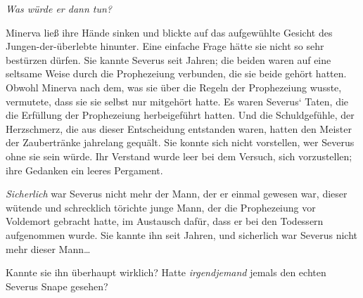 \later

\emph{Was würde er dann tun?}

Minerva ließ ihre Hände sinken und blickte auf das aufgewühlte Gesicht des Jungen-der-überlebte hinunter. Eine einfache Frage hätte sie nicht so sehr bestürzen dürfen. Sie kannte Severus seit Jahren; die beiden waren auf eine seltsame Weise durch die Prophezeiung verbunden, die sie beide gehört hatten. Obwohl Minerva nach dem, was sie über die Regeln der Prophezeiung wusste, vermutete, dass sie sie selbst nur mitgehört hatte. Es waren Severus‘ Taten, die die Erfüllung der Prophezeiung herbeigeführt hatten. Und die Schuldgefühle, der Herzschmerz, die aus dieser Entscheidung entstanden waren, hatten den Meister der Zaubertränke jahrelang gequält. Sie konnte sich nicht vorstellen, wer Severus ohne sie sein würde. Ihr Verstand wurde leer bei dem Versuch, sich vorzustellen; ihre Gedanken ein leeres Pergament.

\emph{Sicherlich} war Severus nicht mehr der Mann, der er einmal gewesen war, dieser wütende und schrecklich törichte junge Mann, der die Prophezeiung vor Voldemort gebracht hatte, im Austausch dafür, dass er bei den Todessern aufgenommen wurde.
Sie kannte ihn seit Jahren, und sicherlich war Severus nicht mehr dieser Mann…


Kannte sie ihn überhaupt wirklich? Hatte \emph{irgendjemand} jemals den echten Severus Snape gesehen?

